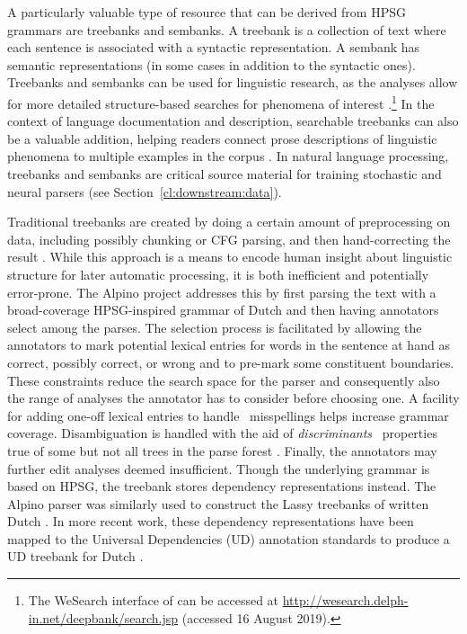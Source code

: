 \documentclass[output=paper,nonflat]{langsci/langscibook}
\begin{document}
A particularly valuable type of resource that can be derived from HPSG
grammars are treebanks and sembanks. A treebank is a collection of
text where each sentence is associated with a syntactic
representation. A sembank has semantic representations (in some cases
in addition to the syntactic ones). Treebanks and sembanks can be used
for linguistic research, as the analyses allow for more detailed
structure-based searches for phenomena of interest \citep{Rohde:05,Gho:Bir:10,Kou:Oep:14}.\footnote{The WeSearch interface of \citet{Kou:Oep:14} can be accessed at \url{http://wesearch.delph-in.net/deepbank/search.jsp} (accessed 16 August 2019).}
In the context of language documentation and description, searchable
treebanks can also be a valuable addition, helping readers connect
prose descriptions of linguistic phenomena to multiple examples in the
corpus \citep{Ben:Gho:Bal:Dri:12}. In natural language processing,
treebanks and sembanks are critical source material for training
stochastic and neural parsers (see Section~\ref{cl:downstream:data}).

Traditional treebanks are created by doing a certain amount of
preprocessing on data, including possibly chunking or CFG parsing, and
then hand-correcting the result \citep{Mar:San:Mar:93,Ban:Bon:Cai:13}.
While this approach is a means to encode human insight about
linguistic structure for later automatic processing, it is both
inefficient and potentially error-prone. The Alpino project
\citep{vanderbeek2002alpino} addresses this by first parsing the text
with a broad-coverage HPSG-inspired grammar of Dutch and then having
annotators select among the parses. The selection process is
facilitated by allowing the annotators to mark potential lexical
entries for words in the sentence at hand as correct, possibly
correct, or wrong and to pre-mark some constituent boundaries. These
constraints reduce the search space for the parser and consequently
also the range of analyses the annotator has to consider before
choosing one. A facility for adding one-off lexical entries to handle
\eg\ misspellings helps increase grammar coverage.  Disambiguation is
handled with the aid of \textit{discriminants} \ie\ properties true of
some but not all trees in the parse forest \citep{Carter:97}. Finally,
the annotators may further edit analyses deemed insufficient. Though
the underlying grammar is based on HPSG, the treebank stores
dependency representations instead.  The Alpino parser was similarly
used to construct the Lassy treebanks of written Dutch
\citep{van:bou:van:13}.  In more recent work, these dependency
representations have been mapped to the Universal Dependencies (UD)
annotation standards \citep{Niv:Mar:Gin:16} to produce a UD treebank
for Dutch \citep{Bou:Van:17}.
\end{document}

